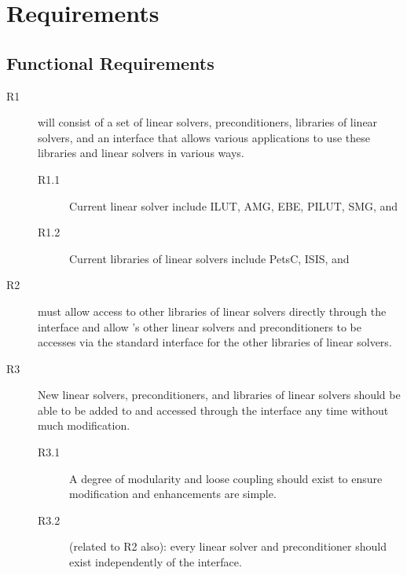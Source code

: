 \chapter{Requirements}
\label{Requirements}

\section{Functional Requirements}
\label{Functional Requirements}

\begin{description}

\item[R1] \hypre{} will consist of a set of linear solvers,
preconditioners, libraries of linear solvers, and an interface that
allows various applications to use these libraries and linear solvers
in various ways.
\begin{description}

\item[R1.1] Current linear solver include ILUT, AMG, EBE, PILUT, SMG,
and

\item[R1.2] Current libraries of linear solvers include PetsC, ISIS, and

\end{description}

\item[R2] \hypre{} must allow access to other libraries of linear
solvers directly through the \hypre{} interface and allow \hypre{}'s other
linear solvers and preconditioners to be accesses via the standard
interface for the other libraries of linear solvers.


\item[R3] New linear solvers, preconditioners, and libraries of
linear solvers should be able to be added to \hypre{} and accessed
through the \hypre{} interface any time without much modification.
\begin{description}

\item[R3.1] A degree of modularity and loose coupling should exist to
ensure modification and enhancements are simple.

\item[R3.2] (related to R2 also): every linear solver and
preconditioner should exist independently of the \hypre{} interface.


\end{description}
\end{description}
